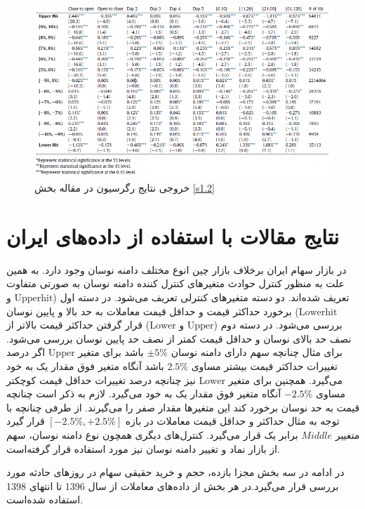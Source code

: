 \documentclass[12pt]{article}
\begin{document}
\begin{landscape}
\begin{figure}[htbp]
\includegraphics[width=1\columnwidth]{Table1.png}
\caption{خروجی نتایج رگرسیون در مقاله بخش \ref {s1.2}}
\label{g1}
\end{figure}
\end{landscape}
\FloatBarrier


\section{نتایج مقالات با استفاده از داده‌های ایران}
در بازار سهام ایران برخلاف بازار چین انوع مختلف دامنه نوسان وجود دارد. به همین علت به منظور کنترل حوادث متغیر‌های کنترل کننده دامنه نوسان به صورتی متفاوت تعریف شده‌اند. دو دسته متغیر‌های کنترلی تعریف می‌شود. در دسته اول 
($ \text{Upperhit} $ 
 و
 $ \text{Lowerhit} $)
برخورد حداکثر قیمت و حداقل قیمت معاملات به حد بالا و پایین نوسان بررسی می‌شود. در دسته دوم
($ \text{Upper} $ 
 و
 $ \text{Lower} $)
 قرار گرفتن حداکثر قیمت بالا‌تر از نصف حد بالای نوسان و حداقل قیمت کمتر از نصف حد پایین نوسان بررسی می‌شود. برای مثال چنانچه سهم دارای دامنه نوسان
  $ \pm 5 \% $
باشد برای متغیر 
$ \text{Upper} $
اگر درصد تغییرات حداکثر قیمت بیشتر مساوی 
$ 2.5 \%  $
باشد آنگاه متغیر فوق مقدار یک به خود می‌گیرد.
همچنین برای متغیر 
$ \text{Lower} $
نیز چنانچه درصد تغییرات حداقل قیمت کوچکتر مساوی 
$- 2.5 \%  $
 آنگاه متغیر فوق مقدار یک به خود می‌گیرد. لازم به ذکر است چنانچه قیمت به حد نوسان برخورد کند این متغیر‌ها مقدار صفر را می‌گیرند. از طرفی چنانچه با توجه به مثال حداکثر و حداقل قیمت معاملات در بازه 
 $ [-2.5\%,+2.5\%] $
 قرار گیرد متغییر $ Middle $ برابر یک قرار می‌گیرد.
 کنترل‌های دیگری همچون نوع دامنه نوسان، سهم از بازار نماد  و تغییر دامنه نوسان نیز مورد استفاده قرار گرفته‌است.


در ادامه در سه بخش مجزا بازده، حجم و خرید حقیقی سهام در روز‌های حادثه مورد بررسی قرار می‌گیرد.در هر بخش از داده‌های معاملات از سال 1396 تا انتهای 1398 استفاده شده‌است.
\end{document}
